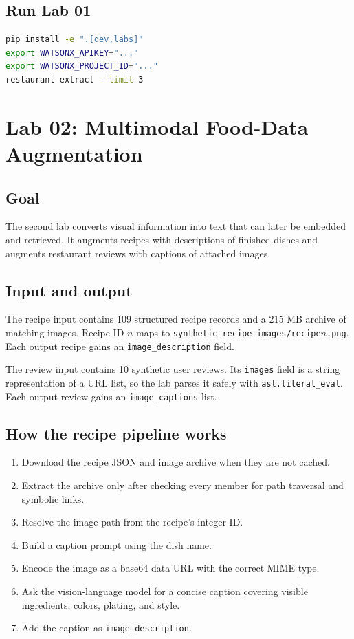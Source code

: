\documentclass[11pt]{article}
\begin{document}
\subsection{Run Lab 01}

\begin{lstlisting}[language=bash]
pip install -e ".[dev,labs]"
export WATSONX_APIKEY="..."
export WATSONX_PROJECT_ID="..."
restaurant-extract --limit 3
\end{lstlisting}

\section{Lab 02: Multimodal Food-Data Augmentation}

\subsection{Goal}

The second lab converts visual information into text that can later be embedded
and retrieved. It augments recipes with descriptions of finished dishes and
augments restaurant reviews with captions of attached images.

\subsection{Input and output}

The recipe input contains 109 structured recipe records and a 215 MB archive of
matching images. Recipe ID \(n\) maps to
\texttt{synthetic\_recipe\_images/recipe\(n\).png}. Each output recipe gains an
\texttt{image\_description} field.

The review input contains 10 synthetic user reviews. Its \texttt{images} field
is a string representation of a URL list, so the lab parses it safely with
\texttt{ast.literal\_eval}. Each output review gains an
\texttt{image\_captions} list.

\subsection{How the recipe pipeline works}

\begin{enumerate}
  \item Download the recipe JSON and image archive when they are not cached.
  \item Extract the archive only after checking every member for path traversal
        and symbolic links.
  \item Resolve the image path from the recipe's integer ID.
  \item Build a caption prompt using the dish name.
  \item Encode the image as a base64 data URL with the correct MIME type.
  \item Ask the vision-language model for a concise caption covering visible
        ingredients, colors, plating, and style.
  \item Add the caption as \texttt{image\_description}.
\end{enumerate}
\end{document}
